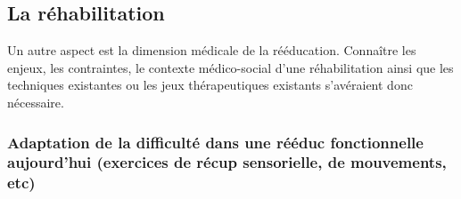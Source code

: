 	\subsection{La réhabilitation}
Un autre aspect est la dimension médicale de la rééducation. Connaître les enjeux, les contraintes, le contexte médico-social d'une réhabilitation ainsi que les techniques existantes ou les jeux thérapeutiques existants s'avéraient donc nécessaire.
	
		\subsubsection{Adaptation de la difficulté dans une rééduc fonctionnelle aujourd'hui (exercices de récup sensorielle, de mouvements, etc)}